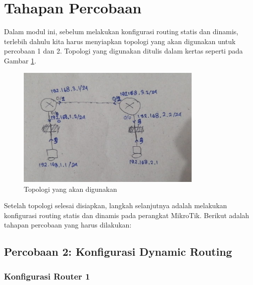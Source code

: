 \section*{Tahapan Percobaan} %

Dalam modul ini, sebelum melakukan konfigurasi routing statis dan dinamis, terlebih dahulu kita harus menyiapkan topologi yang akan digunakan untuk percobaan 1 dan 2. Topologi yang digunakan ditulis dalam kertas seperti pada Gambar \ref{fig:topo}.

\begin{figure}[H]
    \centering
    \includegraphics[width=0.8\textwidth]{img/topologi.jpeg}
    \caption{Topologi yang akan digunakan}
    \label{fig:topo}
\end{figure}

Setelah topologi selesai disiapkan, langkah selanjutnya adalah melakukan konfigurasi routing statis dan dinamis pada perangkat MikroTik. Berikut adalah tahapan percobaan yang harus dilakukan:

\subsection*{Percobaan 2: Konfigurasi Dynamic Routing}

\subsubsection*{Konfigurasi Router 1}

